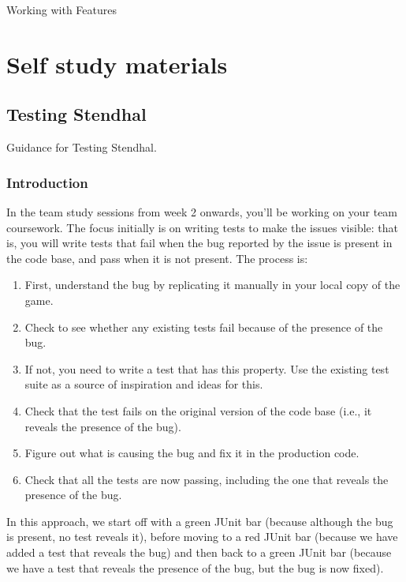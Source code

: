 \documentclass[
]{book}
\providecommand{\tightlist}{%
  \setlength{\itemsep}{0pt}\setlength{\parskip}{0pt}}
\begin{document}
Working with Features

\hypertarget{part-self-study-materials}{%
\part{Self study materials}\label{part-self-study-materials}}

\hypertarget{guiding}{%
\chapter{Testing Stendhal}\label{guiding}}

Guidance for Testing Stendhal.

\hypertarget{intros}{%
\section{Introduction}\label{intros}}

In the team study sessions from week 2 onwards, you'll be working on your team coursework. The focus initially is on writing tests to make the issues visible: that is, you will write tests that fail when the bug reported by the issue is present in the code base, and pass when it is not present. The process is:

\begin{enumerate}
\def\labelenumi{\arabic{enumi}.}
\tightlist
\item
  First, understand the bug by replicating it manually in your local copy of the game.
\item
  Check to see whether any existing tests fail because of the presence of the bug.
\item
  If not, you need to write a test that has this property. Use the existing test suite as a source of inspiration and ideas for this.
\item
  Check that the test fails on the original version of the code base (i.e., it reveals the presence of the bug).
\item
  Figure out what is causing the bug and fix it in the production code.
\item
  Check that all the tests are now passing, including the one that reveals the presence of the bug.
\end{enumerate}

In this approach, we start off with a green JUnit bar (because although the bug is present, no test reveals it), before moving to a red JUnit bar (because we have added a test that reveals the bug) and then back to a green JUnit bar (because we have a test that reveals the presence of the bug, but the bug is now fixed).
\end{document}
